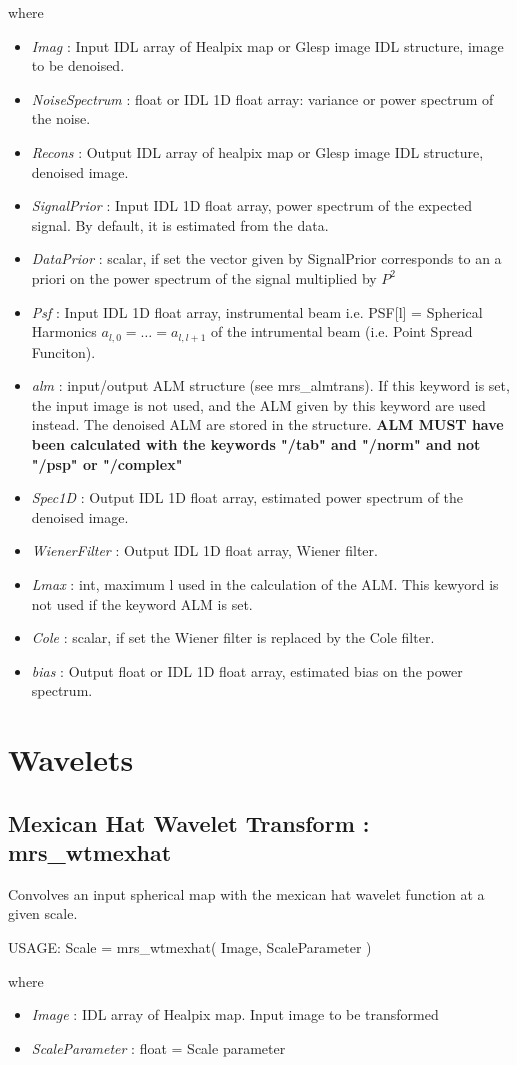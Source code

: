 where
\begin{itemize}
\item {\em Imag} : Input IDL array of Healpix map or Glesp image IDL structure, image to be denoised.
\item {\em NoiseSpectrum} : float or IDL 1D float array: variance or power spectrum of the noise.
\item {\em Recons} : Output IDL array of healpix map or Glesp image IDL structure, denoised image.
\item {\em SignalPrior} : Input IDL 1D float array, power spectrum of the expected signal. By default, it is estimated from the data.
\item {\em DataPrior} : scalar, if set the vector given by SignalPrior corresponds to an a priori on the power spectrum of the signal multiplied by $P^2$
\item {\em Psf} : Input IDL 1D float array, instrumental beam i.e. PSF[l] = Spherical Harmonics $a_{l,0} = \ldots = a_{l,l+1}$ of the intrumental beam (i.e. Point Spread Funciton).
\item {\em alm} : input/output ALM structure (see mrs\_almtrans). If this keyword is set, the input image 
is not used, and the ALM given by this keyword are used instead. The denoised ALM are stored in the structure.
{\bf ALM MUST have been calculated with the keywords "/tab" and "/norm" and not "/psp" or "/complex"} 
\item {\em Spec1D} : Output IDL 1D float array, estimated power spectrum of the denoised image.
\item {\em WienerFilter} : Output IDL 1D float array, Wiener filter.
\item {\em Lmax} : int, maximum l used in the calculation of the ALM. This kewyord is not used if the keyword ALM is set.
\item {\em Cole} : scalar, if set the Wiener filter is replaced by the Cole filter.
\item {\em bias} : Output float or IDL 1D float array, estimated bias on the power spectrum.
\end{itemize}



\section{Wavelets}

\subsection{Mexican Hat Wavelet Transform : mrs\_wtmexhat}
Convolves an input spherical map with the mexican hat wavelet function at a given scale.
{\bf
\begin{center}
     USAGE: Scale = mrs\_wtmexhat( Image, ScaleParameter )   
\end{center}}
where 
\begin{itemize}
\item {\em Image} : IDL array of Healpix map. Input image to be transformed 
\item {\em ScaleParameter} : float = Scale parameter  
\end{itemize}
